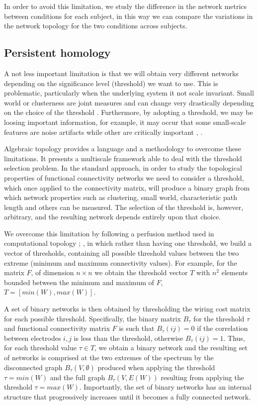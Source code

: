 \documentclass[11pt, onecolumn]{article}
\begin{document}
In order to avoid this limitation, we study the difference in the network metrics between conditions for each subject, in this way we can compare the variations in the network topology for the two conditions across subjects.


\subsection{Persistent homology}
A not less important limitation is that we will obtain very different networks depending on the significance level (threshold) we want to use. This is problematic, particularly when the underlying system it not scale invariant. Small world or clusterness are joint measures and can change very drastically depending on the choice of the threshold \cite{toppi2012statistical}. Furthermore, by adopting a threshold, we may be loosing important information, for example, it may occur that some small-scale features are noise artifacts while other are critically important \cite{fallani2014graph}, \cite{papo2014complex}.

Algebraic topology \cite{munkres1984elements} provides a language and a methodology to overcome these limitations. It presents a multiscale framework able to deal with the threshold selection problem.
In the standard approach, in order to study the  topological properties of functional connectivity networks we need to consider a threshold, which once applied to the connectivity matrix, will produce a binary graph from which network properties such as clustering, small world, characteristic path length and others can be measured. 
The selection of the threshold is, however, arbitrary, and the resulting network depends entirely upon that choice.

We overcome this limitation by following a perfusion method used in computational topology \citep{dabaghian2014reconceiving}; \citep{dotko2016topological}, in which rather than having one threshold, we build a vector of thresholds, containing all possible threshold values between the two extreme (minimum and maximum connectivity values). For example, for the matrix $F$, of dimension $n \times n$ we obtain the threshold vector $T$ with $n^2$ elements bounded between the minimum and maximum of $F$, $T = [min(W), max(W)]$.

A set of binary networks is then obtained by thresholding the wiring cost matrix for each possible threshold. Specifically, the binary matrix $B_{\tau}$ for the threshold $\tau$ and functional connectivity matrix $F$ is such that $B_{\tau}(ij) =0$ if the correlation between electrodes $i,j$ is less than the threshold, otherwise $B_{\tau}(ij)=1$. 
Thus, for each threshold value $\tau \in T$, we obtain a binary network and the resulting set of networks is comprised at the two extremes of the spectrum by the disconnected graph $B_{\tau}(V,\emptyset)$ produced when applying the threshold $\tau = min(W)$ and the full graph $B_{\tau}(V,E(W))$ resulting from applying the threshold $\tau = max(W)$. 
Importantly, the set of binary networks has an internal structure that progressively increases until it becomes a fully connected network. 
\end{document}
